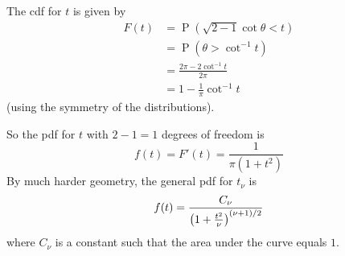\documentclass[fleqn,a4paper,11pt]{article}
\DeclareMathOperator{\prob}{\mathrm P}
\begin{document}
The cdf for \(t\) is given by
\begin{align*}
F(t) &= \prob(\sqrt{2 - 1}\cot \theta < t) \\
     &= \prob(\theta > \cot^{-1} t) \\
     &= \frac{2\pi - 2\cot^{-1} t}{2\pi} \\
     &= 1 - \frac 1\pi \cot^{-1} t
\end{align*}
(using the symmetry of the distributions).

So the pdf for \(t\) with \(2 - 1 = 1\) degrees of freedom is
\begin{equation*}
f(t) = F'(t) = \frac{1}{\pi(1 + t^2)}
\end{equation*}
By much harder geometry, the general pdf for \(t_\nu\) is
\begin{equation*}
f(t) = \frac{C_\nu}{\pqty{1 + \frac{t^2}{\nu}}^{(\nu + 1) / 2}}
\end{equation*}
where \(C_\nu\) is a constant such that the area under the curve equals \(1\).
\end{document}
